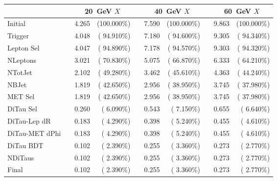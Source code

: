 \begin{tabular}{lrrrrrrrrr}
\toprule
               & & \multicolumn{2}{c}{\SI{20}{\GeV} $X$} & & \multicolumn{2}{c}{\SI{40}{\GeV} $X$} & & \multicolumn{2}{c}{\SI{60}{\GeV} $X$} \\
\midrule
Initial        & & 4.265          & (100.000\%)          & & 7.590          & (100.000\%)          & & 9.863          & (100.000\%)          \\
Trigger        & & 4.048          & ( 94.910\%)          & & 7.180          & ( 94.600\%)          & & 9.305          & ( 94.340\%)          \\
Lepton Sel     & & 4.047          & ( 94.890\%)          & & 7.178          & ( 94.570\%)          & & 9.303          & ( 94.320\%)          \\
NLeptons       & & 3.021          & ( 70.830\%)          & & 5.075          & ( 66.870\%)          & & 6.333          & ( 64.210\%)          \\
NTotJet        & & 2.102          & ( 49.280\%)          & & 3.462          & ( 45.610\%)          & & 4.363          & ( 44.240\%)          \\
NBJet          & & 1.819          & ( 42.650\%)          & & 2.956          & ( 38.950\%)          & & 3.745          & ( 37.980\%)          \\
MET Sel        & & 1.819          & ( 42.650\%)          & & 2.956          & ( 38.950\%)          & & 3.745          & ( 37.980\%)          \\
DiTau Sel      & & 0.260          & (  6.090\%)          & & 0.543          & (  7.150\%)          & & 0.655          & (  6.640\%)          \\
DiTau-Lep dR   & & 0.183          & (  4.290\%)          & & 0.398          & (  5.240\%)          & & 0.455          & (  4.610\%)          \\
DiTau-MET dPhi & & 0.183          & (  4.290\%)          & & 0.398          & (  5.240\%)          & & 0.455          & (  4.610\%)          \\
DiTau BDT      & & 0.102          & (  2.390\%)          & & 0.255          & (  3.360\%)          & & 0.273          & (  2.770\%)          \\
NDiTaus        & & 0.102          & (  2.390\%)          & & 0.255          & (  3.360\%)          & & 0.273          & (  2.770\%)          \\
Final          & & 0.102          & (  2.390\%)          & & 0.255          & (  3.360\%)          & & 0.273          & (  2.770\%)          \\
\bottomrule
\end{tabular}